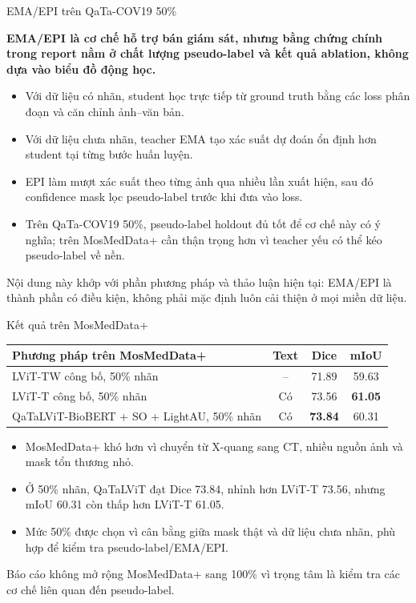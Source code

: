 \documentclass[aspectratio=169,11pt]{beamer}
\newcommand{\reportclaim}[1]{%
  \vspace{0.10cm}
  {\large\bfseries\color{accentblue}#1\par}
  \vspace{0.08cm}
}
\newcommand{\smallnote}[1]{%
  \par
  \vspace{0.12cm}
  {\footnotesize\color{ink}#1\par}
}
\begin{document}
\begin{frame}{EMA/EPI trên QaTa-COV19 50\%}
  \reportclaim{EMA/EPI là cơ chế hỗ trợ bán giám sát, nhưng bằng chứng chính trong report nằm ở chất lượng pseudo-label và kết quả ablation, không dựa vào biểu đồ động học.}
  \begin{itemize}
    \item Với dữ liệu có nhãn, student học trực tiếp từ ground truth bằng các loss phân đoạn và căn chỉnh ảnh--văn bản.
    \item Với dữ liệu chưa nhãn, teacher EMA tạo xác suất dự đoán ổn định hơn student tại từng bước huấn luyện.
    \item EPI làm mượt xác suất theo từng ảnh qua nhiều lần xuất hiện, sau đó confidence mask lọc pseudo-label trước khi đưa vào loss.
    \item Trên QaTa-COV19 50\%, pseudo-label holdout đủ tốt để cơ chế này có ý nghĩa; trên MosMedData+ cần thận trọng hơn vì teacher yếu có thể kéo pseudo-label về nền.
  \end{itemize}
  \smallnote{Nội dung này khớp với phần phương pháp và thảo luận hiện tại: EMA/EPI là thành phần có điều kiện, không phải mặc định luôn cải thiện ở mọi miền dữ liệu.}
\end{frame}

\begin{frame}{Kết quả trên MosMedData+}
  \begin{center}
  \scriptsize
  \renewcommand{\arraystretch}{1.18}
  \begin{tabular}{lccc}
    \toprule
    \textbf{Phương pháp trên MosMedData+} & \textbf{Text} & \textbf{Dice} & \textbf{mIoU} \\
    \midrule
    LViT-TW công bố, 50\% nhãn & -- & 71.89 & 59.63 \\
    LViT-T công bố, 50\% nhãn & Có & 73.56 & \textbf{61.05} \\
    QaTaLViT-BioBERT + SO + LightAU, 50\% nhãn & Có & \textbf{73.84} & 60.31 \\
    \bottomrule
  \end{tabular}
  \end{center}
  \vspace{0.16cm}
  \begin{itemize}
    \item MosMedData+ khó hơn vì chuyển từ X-quang sang CT, nhiều nguồn ảnh và mask tổn thương nhỏ.
    \item Ở 50\% nhãn, QaTaLViT đạt Dice 73.84, nhỉnh hơn LViT-T 73.56, nhưng mIoU 60.31 còn thấp hơn LViT-T 61.05.
    \item Mức 50\% được chọn vì cân bằng giữa mask thật và dữ liệu chưa nhãn, phù hợp để kiểm tra pseudo-label/EMA/EPI.
  \end{itemize}
  \smallnote{Báo cáo không mở rộng MosMedData+ sang 100\% vì trọng tâm là kiểm tra các cơ chế liên quan đến pseudo-label.}
\end{frame}
\end{document}
